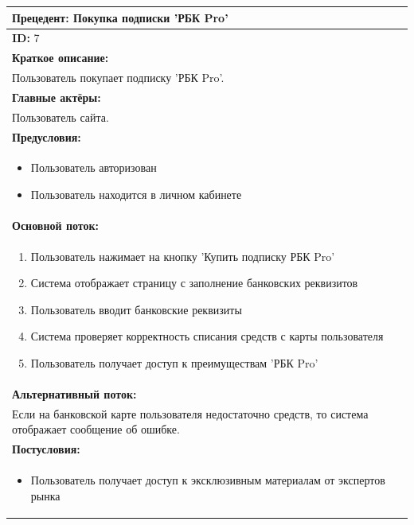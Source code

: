 \documentclass{scrreprt}
\begin{document}
\vspace{10px}
\noindent
\begin{tabularx}{\textwidth}{|X|}
	\hline
	\textbf{Прецедент: Покупка подписки 'РБК Pro'} \\
	\hline
	\textbf{ID:} 7 \\
	\hline
	\textbf{Краткое описание:} \\
	Пользователь покупает подписку 'РБК Pro'. \\
	\hline
	\textbf{Главные актёры:} \\
	Пользователь сайта. \\
	\hline
	\textbf{Предусловия:} \\
	\begin{itemize}[nosep,leftmargin=*]
		\item Пользователь авторизован 
		\item Пользователь находится в личном кабинете 
	\end{itemize} \\
	\hline
	\textbf{Основной поток:} \\
	\begin{enumerate}[nosep,leftmargin=*]
		\item Пользователь нажимает на кнопку 'Купить подписку РБК Pro'
		\item Система отображает страницу с заполнение банковских реквизитов
		\item Пользователь вводит банковские реквизиты
		\item Система проверяет корректность списания средств с карты пользователя
		\item Пользователь получает доступ к преимуществам 'РБК Pro'
	\end{enumerate} \\
	\hline
	\textbf{Альтернативный поток:} \\
	Если на банковской карте пользователя недостаточно средств, то система отображает сообщение об ошибке.\\
	\hline
	\textbf{Постусловия:} \\
	\begin{itemize}[nosep,leftmargin=*]
		\item Пользователь получает доступ к эксклюзивным материалам от экспертов рынка
	\end{itemize} \\
	\hline
\end{tabularx}
\end{document}
